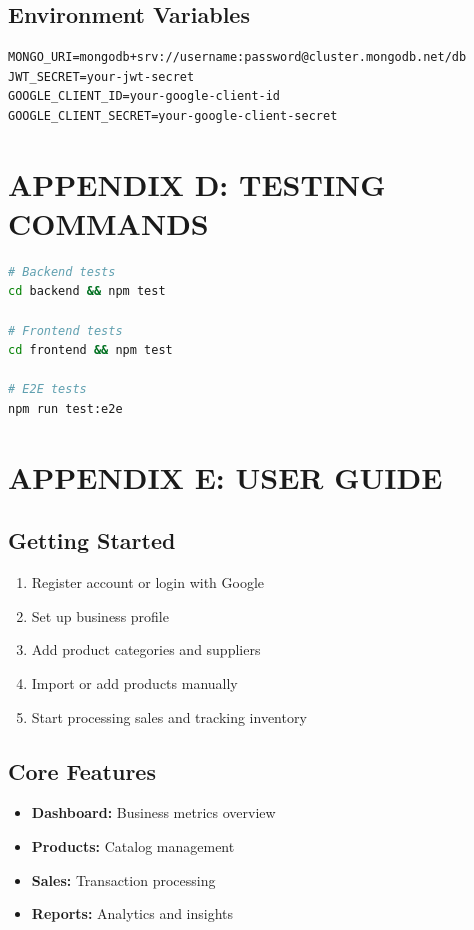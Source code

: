 \subsection*{Environment Variables}
\begin{lstlisting}[caption=Required Environment Variables]
MONGO_URI=mongodb+srv://username:password@cluster.mongodb.net/db
JWT_SECRET=your-jwt-secret
GOOGLE_CLIENT_ID=your-google-client-id
GOOGLE_CLIENT_SECRET=your-google-client-secret
\end{lstlisting}

\section*{APPENDIX D: TESTING COMMANDS}

\begin{lstlisting}[language=bash, caption=Test Commands]
# Backend tests
cd backend && npm test

# Frontend tests  
cd frontend && npm test

# E2E tests
npm run test:e2e
\end{lstlisting}

\section*{APPENDIX E: USER GUIDE}

\subsection*{Getting Started}
\begin{enumerate}
\item Register account or login with Google
\item Set up business profile
\item Add product categories and suppliers
\item Import or add products manually
\item Start processing sales and tracking inventory
\end{enumerate}

\subsection*{Core Features}
\begin{itemize}
\item \textbf{Dashboard:} Business metrics overview
\item \textbf{Products:} Catalog management
\item \textbf{Sales:} Transaction processing  
\item \textbf{Reports:} Analytics and insights
\end{itemize}